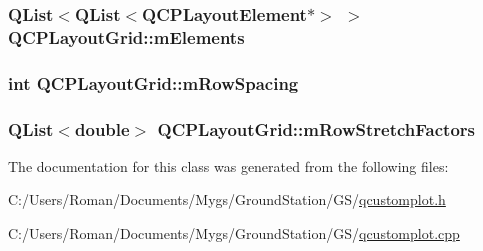 \subsubsection[{m\+Elements}]{\setlength{\rightskip}{0pt plus 5cm}Q\+List$<$Q\+List$<${\bf Q\+C\+P\+Layout\+Element}$\ast$$>$ $>$ Q\+C\+P\+Layout\+Grid\+::m\+Elements\hspace{0.3cm}{\ttfamily [protected]}}\label{class_q_c_p_layout_grid_a3577d3855bf8ad20ef9079291a49f397}
\hypertarget{class_q_c_p_layout_grid_a8b67f183f4645739cc4c794d75843b40}{}
\subsubsection[{m\+Row\+Spacing}]{\setlength{\rightskip}{0pt plus 5cm}int Q\+C\+P\+Layout\+Grid\+::m\+Row\+Spacing\hspace{0.3cm}{\ttfamily [protected]}}\label{class_q_c_p_layout_grid_a8b67f183f4645739cc4c794d75843b40}
\hypertarget{class_q_c_p_layout_grid_a36c85a7eaf342680fb9b8a4977486f16}{}
\subsubsection[{m\+Row\+Stretch\+Factors}]{\setlength{\rightskip}{0pt plus 5cm}Q\+List$<$double$>$ Q\+C\+P\+Layout\+Grid\+::m\+Row\+Stretch\+Factors\hspace{0.3cm}{\ttfamily [protected]}}\label{class_q_c_p_layout_grid_a36c85a7eaf342680fb9b8a4977486f16}


The documentation for this class was generated from the following files\+:\begin{DoxyCompactItemize}
\item 
C\+:/\+Users/\+Roman/\+Documents/\+Mygs/\+Ground\+Station/\+G\+S/\hyperlink{qcustomplot_8h}{qcustomplot.\+h}\item 
C\+:/\+Users/\+Roman/\+Documents/\+Mygs/\+Ground\+Station/\+G\+S/\hyperlink{qcustomplot_8cpp}{qcustomplot.\+cpp}\end{DoxyCompactItemize}
